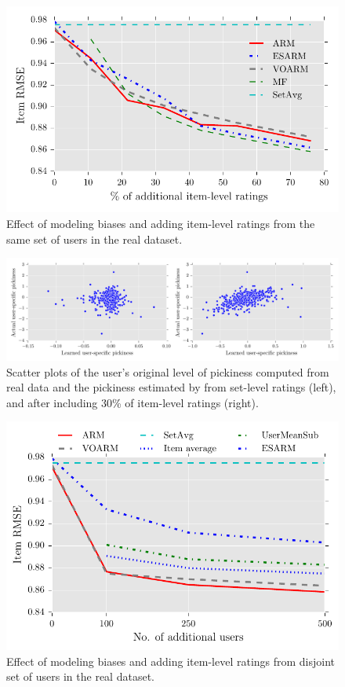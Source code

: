 \begin{figure}[bt]
  \centerline{\includegraphics[scale=0.8]{figures/add_items_real_wbias.pdf}}
  \caption{Effect of modeling biases and adding item-level ratings from the same set of users in the real dataset.}
  \label{fig:real_add_items_wbias}
\end{figure}

\begin{figure}[bt]
  \centerline{\includegraphics[scale=0.57]{figures/recov_real_mix.pdf}}
  \caption{
    Scatter plots of the user's original level of pickiness computed from real
    data and the pickiness estimated by \VO from set-level ratings (left), and
    after including 30\% of item-level ratings (right).  
  }
  \label{fig:real_add_items_recov}
\end{figure}



\begin{figure}[bt]
  \centerline{\includegraphics[scale=0.8]{figures/add_users_real_wbias.pdf}}
  \caption{Effect of modeling biases and adding item-level ratings from disjoint set of users in the real dataset.}
  \label{fig:real_add_users_wbias}
\end{figure}


